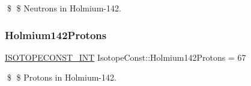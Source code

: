 \$ \$ Neutrons in Holmium-\/142. \mbox{\label{group___isotope_const-_holmium-_ho142_ga77f1270db97f1803b10cedaeada4726e}} 
\subsubsection{\texorpdfstring{Holmium142\+Protons}{Holmium142Protons}}
{\footnotesize\ttfamily \mbox{\hyperlink{group___isotope_const-_macros_ga5f18360b3e99483a35c32d789e62621c}{I\+S\+O\+T\+O\+P\+E\+C\+O\+N\+S\+T\+\_\+\+I\+NT}} Isotope\+Const\+::\+Holmium142\+Protons = 67}

\$ \$ Protons in Holmium-\/142. 